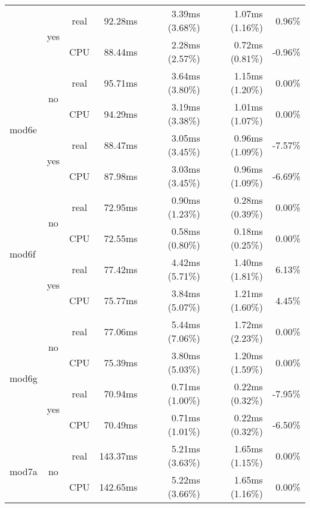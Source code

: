 \documentclass[en]{pracamgr}
\begin{document}
\begin{appendices}
\begin{small}
\begin{longtable}{|l|c|c|r|r|r|r|}
                          \cline{2-7}
                          & \multirow{2}{*}{yes} & real & 92.28ms & 3.39ms (3.68\%) & 1.07ms (1.16\%) & 0.96\% \\*
                          &                      & CPU  & 88.44ms & 2.28ms (2.57\%) & 0.72ms (0.81\%) & -0.96\% \\
\hline
\multirow{4}{*}{mod6e}    & \multirow{2}{*}{no}  & real & 95.71ms & 3.64ms (3.80\%) & 1.15ms (1.20\%) & 0.00\% \\*
                          &                      & CPU  & 94.29ms & 3.19ms (3.38\%) & 1.01ms (1.07\%) & 0.00\% \\*
                          \cline{2-7}
                          & \multirow{2}{*}{yes} & real & 88.47ms & 3.05ms (3.45\%) & 0.96ms (1.09\%) & -7.57\% \\*
                          &                      & CPU  & 87.98ms & 3.03ms (3.45\%) & 0.96ms (1.09\%) & -6.69\% \\
\hline
\multirow{4}{*}{mod6f}    & \multirow{2}{*}{no}  & real & 72.95ms & 0.90ms (1.23\%) & 0.28ms (0.39\%) & 0.00\% \\*
                          &                      & CPU  & 72.55ms & 0.58ms (0.80\%) & 0.18ms (0.25\%) & 0.00\% \\*
                          \cline{2-7}
                          & \multirow{2}{*}{yes} & real & 77.42ms & 4.42ms (5.71\%) & 1.40ms (1.81\%) & 6.13\% \\*
                          &                      & CPU  & 75.77ms & 3.84ms (5.07\%) & 1.21ms (1.60\%) & 4.45\% \\
\hline
\multirow{4}{*}{mod6g}    & \multirow{2}{*}{no}  & real & 77.06ms & 5.44ms (7.06\%) & 1.72ms (2.23\%) & 0.00\% \\*
                          &                      & CPU  & 75.39ms & 3.80ms (5.03\%) & 1.20ms (1.59\%) & 0.00\% \\*
                          \cline{2-7}
                          & \multirow{2}{*}{yes} & real & 70.94ms & 0.71ms (1.00\%) & 0.22ms (0.32\%) & -7.95\% \\*
                          &                      & CPU  & 70.49ms & 0.71ms (1.01\%) & 0.22ms (0.32\%) & -6.50\% \\
\hline
\multirow{4}{*}{mod7a}    & \multirow{2}{*}{no}  & real & 143.37ms & 5.21ms (3.63\%) & 1.65ms (1.15\%) & 0.00\% \\*
                          &                      & CPU  & 142.65ms & 5.22ms (3.66\%) & 1.65ms (1.16\%) & 0.00\% \\*

\end{longtable}
\end{small}
\end{appendices}
\end{document}
